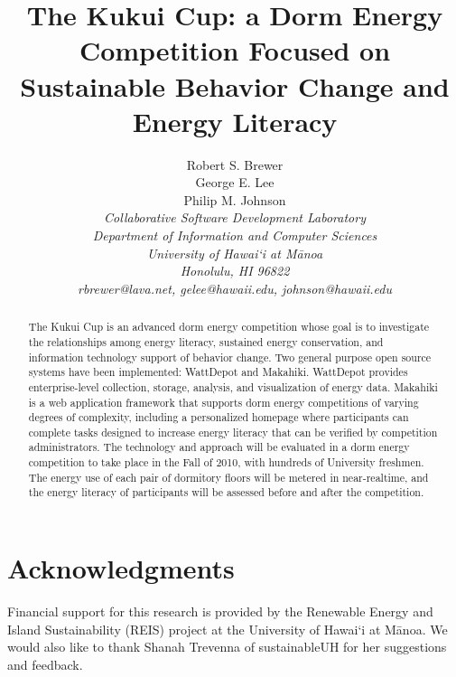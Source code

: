 \documentclass[conference,peerreview]{IEEEtran}
\begin{document}
\title{The Kukui Cup: a Dorm Energy Competition Focused on Sustainable Behavior Change and Energy Literacy}

\author{Robert S. Brewer\\
        George E. Lee \\
        Philip M. Johnson\\
\em     Collaborative Software Development Laboratory\\
        Department of Information and Computer Sciences\\
        University of Hawai`i at M\=anoa\\
        Honolulu, HI 96822\\
        rbrewer@lava.net, gelee@hawaii.edu, johnson@hawaii.edu\\
}


\IEEEpeerreviewmaketitle

\begin{abstract}  %
The Kukui Cup is an advanced dorm energy competition whose goal is to
investigate the relationships among energy literacy, sustained energy
conservation, and information technology support of behavior change. Two
general purpose open source systems have been implemented: WattDepot and
Makahiki. WattDepot provides enterprise-level collection, storage, analysis,
and visualization of energy data. Makahiki is a web application framework that
supports dorm energy competitions of varying degrees of complexity,
including a personalized homepage where participants can complete tasks
designed to increase energy literacy that can be verified by competition
administrators. The technology and approach will be evaluated in a dorm energy
competition to take place in the Fall of 2010, with hundreds of University
freshmen. The energy use of each pair of dormitory floors will be metered in
near-realtime, and the energy literacy of participants will be assessed before
and after the competition.
\end{abstract}







\section{Acknowledgments}

Financial support for this research is provided by the Renewable Energy and
Island Sustainability (REIS) project at the University of Hawai`i at M\=anoa.
We would also like to thank Shanah Trevenna of sustainableUH for her
suggestions and feedback.



\end{document}
